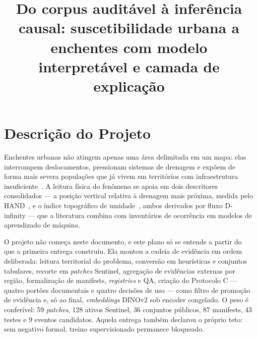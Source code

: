 \documentclass[conference]{IEEEtran}
\begin{document}
\title{Do corpus auditável à inferência causal: suscetibilidade urbana
a enchentes com modelo interpretável e camada de explicação}

\author{
}

\maketitle

\section{Descrição do Projeto}

Enchentes urbanas não atingem apenas uma área delimitada em um mapa: elas
interrompem deslocamentos, pressionam sistemas de drenagem e expõem de forma mais
severa populações que já vivem em territórios com infraestrutura
insuficiente~\cite{tellman2021}. A leitura física do fenômeno se apoia em dois
descritores consolidados --- a posição vertical relativa à drenagem mais próxima,
medida pelo HAND~\cite{renno2008}, e o índice topográfico de
umidade~\cite{beven1979}, ambos derivados por fluxo D-infinity --- que a
literatura combina com inventários de ocorrência em modelos de aprendizado de
máquina.

O projeto não começa neste documento, e este plano só se entende a partir do que
a primeira entrega construiu. Ela montou a cadeia de evidência em ordem
deliberada: leitura territorial do problema, conversão em heurísticas e conjuntos
tabulares, recorte em \emph{patches} Sentinel, agregação de evidências externas
por região, formalização de manifests, \emph{registries} e QA, criação do
Protocolo C --- quatro portões documentais e quatro decisões de uso --- como
filtro de promoção de evidência e, só ao final, \emph{embeddings} DINOv2 sob
encoder congelado. O peso é conferível: 59 \emph{patches}, 128 ativos Sentinel,
36 conjuntos públicos, 87 manifests, 43 testes e 9 eventos candidatos. Aquela
entrega também declarou o próprio teto: sem negativo formal, treino
supervisionado permanece bloqueado.
\end{document}
